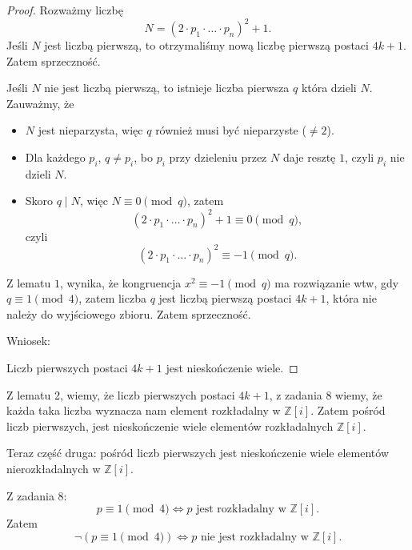 \begin{solution}
\begin{proof}
		Rozważmy liczbę
		\[
		N = \left( 2\cdot p_1\cdot \ldots\cdot p_{n} \right)^2 + 1
		.\] 
		Jeśli $N$ jest liczbą pierwszą, to otrzymaliśmy nową liczbę pierwszą postaci $4k + 1$. Zatem sprzeczność.
 
		Jeśli $N$ nie jest liczbą pierwszą, to istnieje liczba pierwsza $q$ która dzieli $N$. Zauważmy, że
		\begin{itemize}
			\item $N$ jest nieparzysta, więc $q$ również musi być nieparzyste ($\neq 2$).
			\item Dla każdego $p_{i}$, $q\neq p_{i}$, bo $p_{i}$ przy dzieleniu przez $N$ daje resztę $1$, czyli $p_{i}$ nie dzieli $N$. 
			\item Skoro $q\mid N$, więc $N \equiv 0 \pmod{q}$, zatem
				\[
				\left( 2\cdot p_1\cdot \ldots\cdot p_{n} \right)^2 + 1 \equiv 0 \pmod{q} 
				,\] 
				czyli
				\[	
				\left( 2\cdot p_1\cdot \ldots\cdot p_{n} \right)^2 \equiv -1 \pmod{q} 
				.\] 
		\end{itemize}
		Z lematu $1$, wynika, że kongruencja $x^2 \equiv -1 \pmod{q} $ ma rozwiązanie wtw, gdy $q \equiv 1 \pmod{4}$, zatem liczba $q$ jest liczbą pierwszą postaci $4k + 1$, która nie należy do wyjściowego zbioru. Zatem sprzeczność.

		Wniosek:

		Liczb pierwszych postaci $4k + 1$ jest nieskończenie wiele.
	\end{proof} 

	Z lematu 2, wiemy, że liczb pierwszych postaci $4k + 1$, z zadania 8 wiemy, że każda taka liczba wyznacza nam element rozkładalny w $\mathbb{Z}\left[ i \right] $. Zatem pośród liczb pierwszych, jest nieskończenie wiele elementów rozkładalnych $\mathbb{Z}\left[ i \right] $.


\noindent Teraz część druga: pośród liczb pierwszych jest nieskończenie wiele elementów nierozkładalnych w $\mathbb{Z}\left[ i \right]$.

Z zadania 8: 
\[
p \equiv 1 \pmod{4} \iff p \text{ jest rozkładalny w } \mathbb{Z}\left[ i \right] 
.\] 
Zatem
\[
	\neg\left( p \equiv 1 \pmod{4}\right) \iff p \text{ nie jest rozkładalny w } \mathbb{Z}\left[ i \right] 
.\] 


\end{solution}
